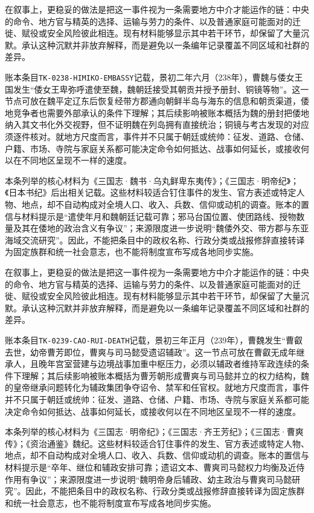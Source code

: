 在叙事上，更稳妥的做法是把这一事件视为一条需要地方中介才能运作的链：中央的命令、地方官与精英的选择、运输与劳力的条件、以及普通家庭可能面对的迁徙、赋役或安全风险彼此相连。现有材料能够显示其中若干环节，却保留了大量沉默。承认这种沉默并非放弃解释，而是避免以一条编年记录覆盖不同区域和社群的差异。

账本条目\texttt{TK-0238-HIMIKO-EMBASSY}记载，景初二年六月（238年），曹魏与倭女王国发生“倭女王卑弥呼遣使至魏，魏朝廷接受其朝贡并授予册封、铜镜等物”。这一节点可放在魏平定辽东后恢复经带方郡通向朝鲜半岛与海东的信息和朝贡渠道，倭地竞争者也需要外部承认的条件下理解；其后续影响被账本概括为魏的册封把倭地纳入其文书化外交视野，但不证明魏在列岛拥有直接统治；铜镜与考古发现的对应须逐件核对。就地方尺度而言，事件并不只属于朝廷或统帅：征发、道路、仓储、户籍、市场、寺院与家庭关系都可能决定命令如何抵达、战事如何延长，或接收何以在不同地区呈现不一样的速度。

本条列举的核心材料为《三国志·魏书·乌丸鲜卑东夷传》；《三国志·明帝纪》；《日本书纪》后出相关记载。这些材料较适合钉住事件的发生、官方表述或特定人物、地点，却不自动构成对全境人口、收入、兵数、信仰或动机的调查。账本的置信与材料提示是“遣使年月和魏朝廷记载可靠；邪马台国位置、使团路线、授物数量及其在倭地的政治含义有争议”；来源限度进一步说明“魏倭外交、带方郡与东亚海域交流研究”。因此，不能把条目中的政权名称、行政分类或战报修辞直接转译为固定族群和统一社会意志，也不能将制度宣布写成各地同步实施。

在叙事上，更稳妥的做法是把这一事件视为一条需要地方中介才能运作的链：中央的命令、地方官与精英的选择、运输与劳力的条件、以及普通家庭可能面对的迁徙、赋役或安全风险彼此相连。现有材料能够显示其中若干环节，却保留了大量沉默。承认这种沉默并非放弃解释，而是避免以一条编年记录覆盖不同区域和社群的差异。

账本条目\texttt{TK-0239-CAO-RUI-DEATH}记载，景初三年正月（239年），曹魏发生“曹叡去世，幼帝曹芳即位，曹爽与司马懿受遗诏辅政”。这一节点可放在曹叡无成年继承人，且晚年宫室营建与边境战事加重中枢压力，必须以辅政者维持军政连续的条件下理解；其后续影响被账本概括为曹芳朝形成曹爽与司马懿并立的权力结构，魏的皇帝继承问题转化为辅政集团争夺诏令、禁军和任官权。就地方尺度而言，事件并不只属于朝廷或统帅：征发、道路、仓储、户籍、市场、寺院与家庭关系都可能决定命令如何抵达、战事如何延长，或接收何以在不同地区呈现不一样的速度。

本条列举的核心材料为《三国志·明帝纪》；《三国志·齐王芳纪》；《三国志·曹爽传》；《资治通鉴》魏纪。这些材料较适合钉住事件的发生、官方表述或特定人物、地点，却不自动构成对全境人口、收入、兵数、信仰或动机的调查。账本的置信与材料提示是“卒年、继位和辅政安排可靠；遗诏文本、曹爽司马懿权力均衡及近侍作用有争议”；来源限度进一步说明“魏明帝身后辅政、幼主政治与曹爽司马懿研究”。因此，不能把条目中的政权名称、行政分类或战报修辞直接转译为固定族群和统一社会意志，也不能将制度宣布写成各地同步实施。

